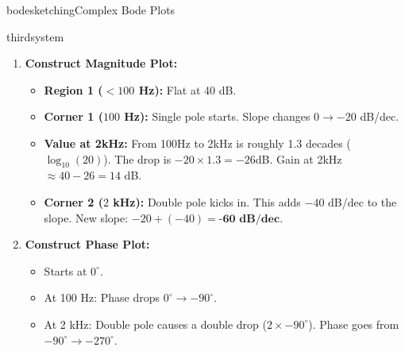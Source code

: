 \begin{mainquestion}{bodesketching}{Complex Bode Plots}
\begin{partquestion}{thirdsystem}
\begin{answer}
\begin{enumerate}
        \item \textbf{Construct Magnitude Plot:}
        \begin{itemize}
            \item \textbf{Region 1 ($<100$ Hz):} Flat at 40 dB.
            \item \textbf{Corner 1 ($100$ Hz):} Single pole starts. Slope changes $0 \to -20$ dB/dec.
            \item \textbf{Value at 2kHz:} From 100Hz to 2kHz is roughly 1.3 decades ($\log_{10}(20)$). The drop is $-20 \times 1.3 = -26$dB. Gain at 2kHz $\approx 40 - 26 = 14$ dB.
            \item \textbf{Corner 2 ($2$ kHz):} Double pole kicks in. This adds $-40$ dB/dec to the slope. New slope: $-20 + (-40) = \textbf{-60 dB/dec}$.
        \end{itemize}
        
        \item \textbf{Construct Phase Plot:}
        \begin{itemize}
            \item Starts at $0^\circ$.
            \item At 100 Hz: Phase drops $0^\circ \to -90^\circ$.
            \item At 2 kHz: Double pole causes a double drop ($2 \times -90^\circ$). Phase goes from $-90^\circ \to -270^\circ$.
        \end{itemize}
    \end{enumerate}
\end{answer}

\end{partquestion}

\end{mainquestion}
